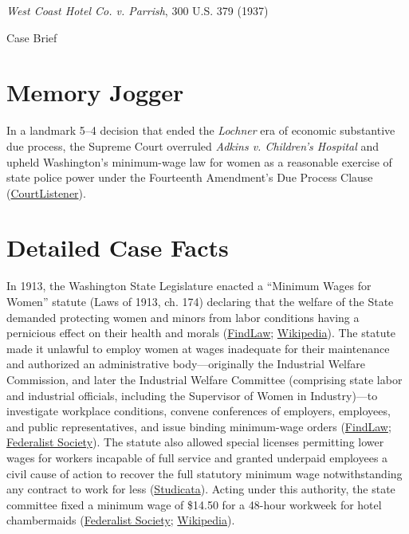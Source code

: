 \documentclass[12pt]{article}
\begin{document}
\begin{center}
{\LARGE \textit{West Coast Hotel Co. v. Parrish}, 300 U.S. 379 (1937)\par}
\vspace{0.8em}
{\large Case Brief\par}
\end{center}
\vspace{1em}

\section{Memory Jogger}

In a landmark 5--4 decision that ended the \textit{Lochner} era of economic substantive due process, the Supreme Court overruled \textit{Adkins v. Children's Hospital} and upheld Washington's minimum-wage law for women as a reasonable exercise of state police power under the Fourteenth Amendment's Due Process Clause (\href{https://www.courtlistener.com/opinion/102784/west-coast-hotel-co-v-parrish/}{CourtListener}).

\section{Detailed Case Facts}

In 1913, the Washington State Legislature enacted a ``Minimum Wages for Women'' statute (Laws of 1913, ch. 174) declaring that the welfare of the State demanded protecting women and minors from labor conditions having a pernicious effect on their health and morals (\href{https://caselaw.findlaw.com/court/us-supreme-court/300/379.html}{FindLaw}; \href{https://en.wikipedia.org/wiki/West_Coast_Hotel_Co._v._Parrish}{Wikipedia}). The statute made it unlawful to employ women at wages inadequate for their maintenance and authorized an administrative body---originally the Industrial Welfare Commission, and later the Industrial Welfare Committee (comprising state labor and industrial officials, including the Supervisor of Women in Industry)---to investigate workplace conditions, convene conferences of employers, employees, and public representatives, and issue binding minimum-wage orders (\href{https://caselaw.findlaw.com/court/us-supreme-court/300/379.html}{FindLaw}; \href{https://fedsoc.org/case/west-coast-hotel-company-v-parrish}{Federalist Society}). The statute also allowed special licenses permitting lower wages for workers incapable of full service and granted underpaid employees a civil cause of action to recover the full statutory minimum wage notwithstanding any contract to work for less (\href{https://www.studicata.com/case-briefs/case/west-coast-hotel-co-v-parrish}{Studicata}). Acting under this authority, the state committee fixed a minimum wage of \$14.50 for a 48-hour workweek for hotel chambermaids (\href{https://fedsoc.org/case/west-coast-hotel-company-v-parrish}{Federalist Society}; \href{https://en.wikipedia.org/wiki/West_Coast_Hotel_Co._v._Parrish}{Wikipedia}).
\end{document}

